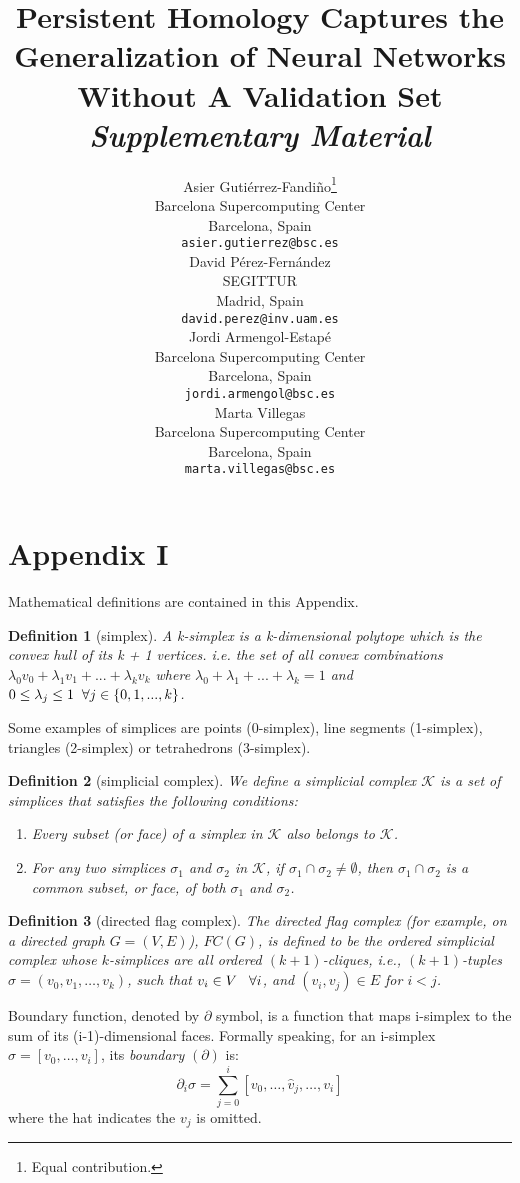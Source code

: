\documentclass{article}
\title{Persistent Homology Captures the Generalization of Neural Networks Without A Validation Set\\
\textit{Supplementary Material}}
\author{
 Asier Gutiérrez-Fandiño\thanks{Equal contribution.}\\
  Barcelona Supercomputing Center\\
  Barcelona, Spain\\
  \texttt{asier.gutierrez@bsc.es} \\
   \And
 David Pérez-Fernández\printfnsymbol{1} \\
  SEGITTUR\\
  Madrid, Spain\\
  \texttt{david.perez@inv.uam.es} \\
  \And
 Jordi Armengol-Estapé \\
  Barcelona Supercomputing Center\\
  Barcelona, Spain\\
  \texttt{jordi.armengol@bsc.es} \\
  \And
 Marta Villegas \\
  Barcelona Supercomputing Center\\
  Barcelona, Spain\\
  \texttt{marta.villegas@bsc.es} \\
}
\newtheorem{definition}{Definition}
\begin{document}
\maketitle


\section*{Appendix I}
Mathematical definitions are contained in this Appendix.
\begin{definition}[simplex]
A \textit{k-simplex} is a k-dimensional polytope which is the convex hull of its k + 1 vertices. i.e. the set of all convex combinations $\lambda_0 v_0 + \lambda_1 v_1 + ... + \lambda_k v_k$ where $\lambda_0 + \lambda_1 + ... + \lambda_k = 1$ and
$0 \leq \lambda_j \leq 1 \hspace{2mm} \forall j \in \{0, 1, ..., k\}$.
\end{definition}
Some examples of simplices are points (0-simplex), line segments (1-simplex), triangles (2-simplex) or tetrahedrons (3-simplex).

\begin{definition}[simplicial complex]
We define a \textit{simplicial complex} $\mathcal{K}$ is a set of simplices that satisfies the following conditions:
\begin{enumerate}
\item Every subset (or face) of a simplex in $\mathcal{K}$ also belongs to $\mathcal{K}$.
\item For any two simplices $\sigma_1$ and $\sigma_2$ in $\mathcal{K}$, if $\sigma_1 \cap \sigma_2 \neq \emptyset$, then $\sigma_1 \cap \sigma_2$ is a common subset, or face, of both $\sigma_1$ and $\sigma_2$.
\end{enumerate}
\end{definition}


\begin{definition}[directed flag complex]
The \textit{directed flag complex} (for example, on a directed graph $G=(V,E)$), $FC(G)$, is defined to be the ordered simplicial complex whose $k$-simplices are all ordered $(k+1)$-cliques, i.e., $(k+1)$-tuples $\sigma=(v_0,v_1,\ldots,v_k)$, such that $v_i \in V \hspace{3mm} \forall i$, and $(v_i,v_j)\in E$ for $i<j$.
\end{definition}



Boundary function, denoted by $\partial$ symbol, is a function that maps i-simplex to the sum of its (i-1)-dimensional faces. Formally speaking, for an i-simplex $\sigma=[v_0,\ldots, v_i]$, its \textit{boundary} $(\partial)$ is:
\begin{equation}
\partial_i\sigma = \sum^i_{j=0}[v_0,\ldots,\hat{v}_j,\ldots,v_i]
\end{equation}
where the hat indicates the $v_j$ is omitted.
\end{document}
